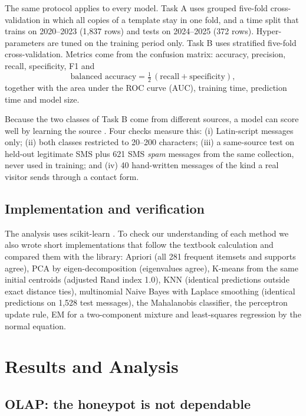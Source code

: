 \documentclass[conference]{IEEEtran}
\begin{document}
The same protocol applies to every model. Task A uses grouped five-fold cross-validation in which all copies
of a template stay in one fold, and a time split that trains on 2020--2023 (1,837 rows) and tests on 2024--2025
(372 rows). Hyper-parameters are tuned on the training period only. Task B uses stratified five-fold
cross-validation. Metrics come from the confusion matrix: accuracy, precision, recall, specificity, F1 and
\begin{equation}
\text{balanced accuracy} = \tfrac{1}{2}\,(\text{recall} + \text{specificity}),
\end{equation}
together with the area under the ROC curve (AUC), training time, prediction time and model size.

Because the two classes of Task B come from different sources, a model can score well by learning the source
\cite{geirhos2020}. Four checks measure this: (i) Latin-script messages only; (ii) both classes restricted to
20--200 characters; (iii) a same-source test on held-out legitimate SMS plus 621 SMS \emph{spam} messages from
the same collection, never used in training; and (iv) 40 hand-written messages of the kind a real visitor
sends through a contact form.

\subsection{Implementation and verification}

The analysis uses scikit-learn \cite{pedregosa2011}. To check our understanding of each method we also wrote
short implementations that follow the textbook calculation and compared them with the library: Apriori (all
281 frequent itemsets and supports agree), PCA by eigen-decomposition (eigenvalues agree), K-means from the
same initial centroids (adjusted Rand index 1.0), KNN (identical predictions outside exact distance ties),
multinomial Naive Bayes with Laplace smoothing (identical predictions on 1,528 test messages), the Mahalanobis
classifier, the perceptron update rule, EM for a two-component mixture and least-squares regression by the
normal equation.

\section{Results and Analysis}

\subsection{OLAP: the honeypot is not dependable}
\label{sec:olap}
\end{document}
